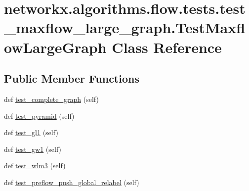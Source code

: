 \hypertarget{classnetworkx_1_1algorithms_1_1flow_1_1tests_1_1test__maxflow__large__graph_1_1TestMaxflowLargeGraph}{}\section{networkx.\+algorithms.\+flow.\+tests.\+test\+\_\+maxflow\+\_\+large\+\_\+graph.\+Test\+Maxflow\+Large\+Graph Class Reference}
\label{classnetworkx_1_1algorithms_1_1flow_1_1tests_1_1test__maxflow__large__graph_1_1TestMaxflowLargeGraph}
\subsection*{Public Member Functions}
\begin{DoxyCompactItemize}
\item 
def \hyperlink{classnetworkx_1_1algorithms_1_1flow_1_1tests_1_1test__maxflow__large__graph_1_1TestMaxflowLargeGraph_af259124e531f29fc5943f41b02f90bad}{test\+\_\+complete\+\_\+graph} (self)
\item 
def \hyperlink{classnetworkx_1_1algorithms_1_1flow_1_1tests_1_1test__maxflow__large__graph_1_1TestMaxflowLargeGraph_ac47dcfde1cfed6ec66d17e536b5b63d1}{test\+\_\+pyramid} (self)
\item 
def \hyperlink{classnetworkx_1_1algorithms_1_1flow_1_1tests_1_1test__maxflow__large__graph_1_1TestMaxflowLargeGraph_ad7239c325475adae467e2e581c4f8afa}{test\+\_\+gl1} (self)
\item 
def \hyperlink{classnetworkx_1_1algorithms_1_1flow_1_1tests_1_1test__maxflow__large__graph_1_1TestMaxflowLargeGraph_a625eb279fc922191fc62de63c37bd7f1}{test\+\_\+gw1} (self)
\item 
def \hyperlink{classnetworkx_1_1algorithms_1_1flow_1_1tests_1_1test__maxflow__large__graph_1_1TestMaxflowLargeGraph_a2d95540f54b4e36689950d5657ee27c2}{test\+\_\+wlm3} (self)
\item 
def \hyperlink{classnetworkx_1_1algorithms_1_1flow_1_1tests_1_1test__maxflow__large__graph_1_1TestMaxflowLargeGraph_a709b0122affb5954f4cfe33d438a751e}{test\+\_\+preflow\+\_\+push\+\_\+global\+\_\+relabel} (self)
\end{DoxyCompactItemize}


